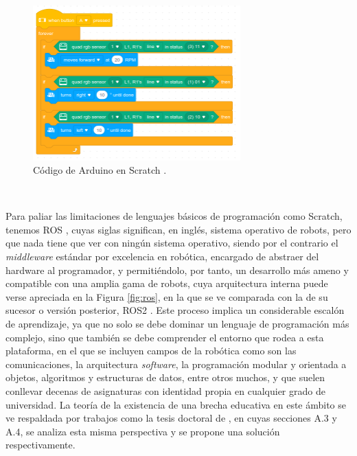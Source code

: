 \begin{figure} [h!]
  \begin{center}
    \includegraphics[width=8cm]{figs/scratch_arduino_code}
  \end{center}
  \caption{Código de Arduino en Scratch \citep{arduino_scratch_code}.}
  \label{fig:scratch}
\end{figure}\

Para paliar las limitaciones de lenguajes básicos de programación como Scratch,
tenemos ROS \citep{ros}, cuyas siglas significan, en inglés, sistema operativo
de robots, pero que nada
tiene que ver con ningún sistema operativo, siendo por el contrario el
\textit{middleware} estándar por excelencia en robótica, encargado de abstraer
del hardware al programador, y permitiéndolo, por tanto, un desarrollo más
ameno y compatible con una amplia gama de robots, cuya arquitectura interna
puede verse apreciada en la Figura \ref{fig:ros}, en la que se ve comparada con
la de su sucesor o versión posterior, ROS2 \citep{ros2}.
Este proceso implica un considerable escalón de aprendizaje, ya que no solo se
debe dominar un lenguaje de programación más complejo, sino que también se debe
comprender el entorno que rodea a esta plataforma, en el que se incluyen campos
de la robótica como son las comunicaciones, la arquitectura \textit{software},
la programación modular y orientada a objetos, algoritmos y estructuras de
datos, entre otros muchos, y que suelen conllevar decenas de asignaturas con
identidad propia en cualquier grado de universidad.
La teoría de la existencia de una brecha educativa en este ámbito se ve
respaldada por trabajos como la tesis doctoral de \citet{vega2018}, en cuyas
secciones A.3 y A.4, se analiza esta misma perspectiva y se propone una solución
respectivamente.

